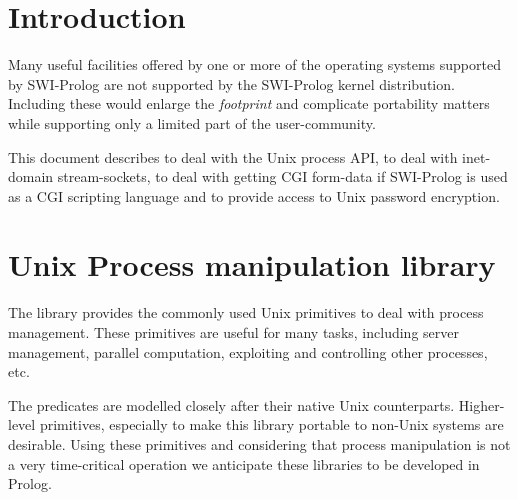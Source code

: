 \documentclass[11pt]{article}
\begin{document}
\vfill
\vfill

\newpage

\section{Introduction}

Many useful facilities offered by one or more of the operating systems
supported by SWI-Prolog are not supported by the SWI-Prolog kernel
distribution.  Including these would enlarge the {\em footprint} and
complicate portability matters while supporting only a limited part of
the user-community.

This document describes  to deal with the Unix process API,
 to deal with inet-domain stream-sockets,  to
deal with getting CGI form-data if SWI-Prolog is used as a CGI scripting
language and  to provide access to Unix password
encryption.


\section{Unix Process manipulation library}

The  library provides the commonly used Unix primitives to
deal with process management. These primitives are useful for many
tasks, including server management, parallel computation, exploiting and
controlling other processes, etc.

The predicates are modelled closely after their native Unix
counterparts. Higher-level primitives, especially to make this library
portable to non-Unix systems are desirable. Using these primitives and
considering that process manipulation is not a very time-critical
operation we anticipate these libraries to be developed in Prolog.
\end{document}
